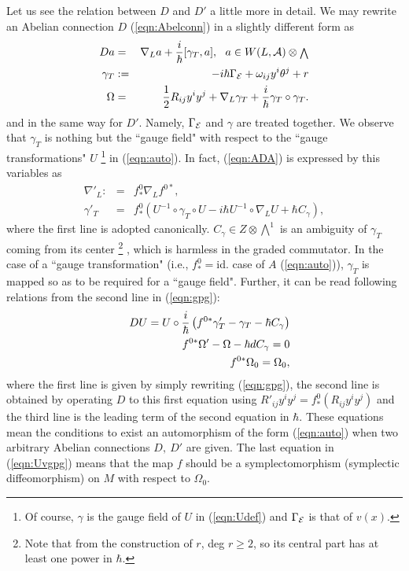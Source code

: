 \documentclass[10pt,a4paper]{article}
\def\h{\hbar}
\begin{document}
Let us see the relation between $D$ and $D'$ a little more in detail. We may rewrite an Abelian connection $D$ (\ref{eqn:Abelconn}) in a slightly different form as
\begin{eqnarray}
\label{eqn:gammaT}
Da&=&\nabla_La+{i\over\h}[\gamma_T,a],\ \ a\in W(L,{\cal A})\otimes {\scriptstyle \bigwedge}\nonumber\\
\gamma_T&:=&-i\h \Gamma_{\cal E}+\omega_{ij}y^i\theta^j+r \nonumber\\
\Omega&=&{1\over2}R_{ij}y^iy^j +\nabla_L\gamma_T+{i\over\h}\gamma_T\circ \gamma_T.
\end{eqnarray}
and in the same way for $D'$. Namely, $\Gamma_{\cal E}$ and $\gamma$ are treated together. We observe that $\gamma_T$ is nothing but the ``gauge field" with respect to the ``gauge transformations" $U$
\footnote{ Of course, $\gamma$ is the gauge field of $U$ in (\ref{eqn:Udef}) and $\Gamma_{\cal E}$ is that of $v(x)$.} in (\ref{eqn:auto}).
In fact, (\ref{eqn:ADA}) is expressed by this variables as
\begin{eqnarray}
\label{eqn:gpg}
\nabla'_L:&=&f^0_*\nabla_Lf^{0*},\nonumber\\
\gamma'_T&=&f^0_*\left(U^{-1}\circ \gamma_T\circ U-i\h U^{-1}\circ \nabla_L U+\h C_\gamma\right),
\end{eqnarray}
where the first line is adopted canonically. $C_\gamma\in Z\otimes {\scriptstyle \bigwedge}^1$ is an ambiguity of $\gamma_T$ coming from its center
\footnote{
Note that from the construction of $r$, deg $r\geq2$, so its central part has at least one power in $\h$.
}
, which is harmless in the graded commutator. In the case of a ``gauge transformation" (i.e., $f^0_*=$id. case of $A$ (\ref{eqn:auto})), $\gamma_T$ is mapped so as to be required for a ``gauge field". Further, it can be read following relations from the second line in (\ref{eqn:gpg}):
\begin{eqnarray}
\label{eqn:Uvgpg}
&&DU=U\circ {i\over\h}\left(f^{0*}\gamma'_T-\gamma_T-\h C_\gamma\right)\nonumber\\
&&f^{0*}\Omega'-\Omega-\h dC_\gamma=0\nonumber\\
&&f^{0*}\Omega_0=\Omega_0,
\end{eqnarray}
where the first line is given by simply rewriting (\ref{eqn:gpg}), the second line is obtained by operating $D$ to this first equation using $R'_{ij}y^iy^j=f^0_*(R_{ij}y^iy^j)$ and the third line is the leading term of the second equation in $\h$.
These equations mean the conditions to exist an automorphism of the form (\ref{eqn:auto}) when two arbitrary Abelian connections $D,\ D'$ are given. The last equation in (\ref{eqn:Uvgpg}) means that the map $f$ should be a symplectomorphism (symplectic diffeomorphism) on $M$ with respect to $\Omega_0$.
\end{document}
